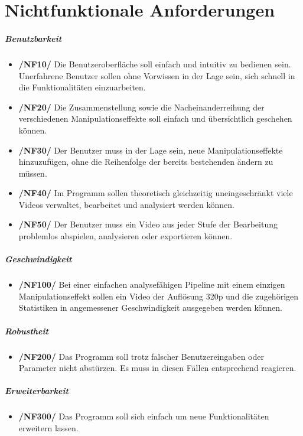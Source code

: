 \section{Nichtfunktionale Anforderungen}

\subparagraph{Benutzbarkeit}
\begin{itemize}
	\item \textbf{/NF10/} Die Benutzeroberfläche soll einfach und intuitiv zu bedienen sein. Unerfahrene Benutzer sollen ohne Vorwissen in der Lage sein, sich schnell in die Funktionalitäten einzuarbeiten.
	\item \textbf{/NF20/} Die Zusammenstellung sowie die Nacheinanderreihung der verschiedenen Manipulationseffekte soll einfach und übersichtlich geschehen können. 
	\item \textbf{/NF30/} Der Benutzer muss in der Lage sein, neue Manipulationseffekte hinzuzufügen, ohne die Reihenfolge der bereits bestehenden ändern zu müssen.
	\item \textbf{/NF40/} Im Programm sollen theoretisch gleichzeitig uneingeschränkt viele Videos verwaltet, bearbeitet und analysiert werden können.
	\item \textbf{/NF50/} Der Benutzer muss ein Video aus jeder Stufe der Bearbeitung problemlos abspielen, analysieren oder exportieren können.
\end{itemize}

\subparagraph{Geschwindigkeit}

\begin{itemize}
	\item \textbf{/NF100/} Bei einer einfachen analysefähigen Pipeline mit einem einzigen Manipulationseffekt sollen ein Video der Auflösung 320p und die zugehörigen Statistiken in angemessener Geschwindigkeit
 ausgegeben werden können.
\end{itemize}

\subparagraph{Robustheit}

\begin{itemize}
	\item \textbf{/NF200/} Das Programm soll trotz falscher Benutzereingaben oder Parameter nicht abstürzen. Es muss in diesen Fällen entsprechend reagieren.
\end{itemize}

\subparagraph{Erweiterbarkeit}

\begin{itemize}
	\item \textbf{/NF300/} Das Programm soll sich einfach um neue Funktionalitäten erweitern lassen.
\end{itemize}

 
